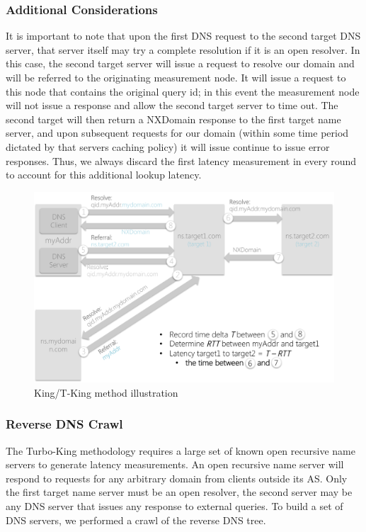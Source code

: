 \subsubsection{Additional Considerations}
It is important to note that upon the first DNS request to the second target DNS server, that server itself may try a complete resolution if it is an open resolver. In this case, the second target server will issue a request to resolve our domain and will be referred to the originating measurement node. It will issue a request to this node that contains the original query id; in this event the measurement node will not issue a response and allow the second target server to time out. The second target will then return a NXDomain response to the first target name server, and upon subsequent requests for our domain (within some time period dictated by that servers caching policy) it will issue continue to issue error responses. Thus, we always discard the first latency measurement in every round to account for this additional lookup latency.

\begin{figure}
  \centering
  \includegraphics[width=\linewidth]{../figs/king_model.pdf}
  \caption{King/T-King method illustration}
  \label{fig:king_model}
\end{figure}

\subsubsection{Reverse DNS Crawl}
The Turbo-King methodology requires a large set of known open recursive name servers to generate latency measurements. An open recursive name server will respond to requests for any arbitrary domain from clients outside its AS. Only the first target name server must be an open resolver, the second server may be any DNS server that issues any response to external queries. To build a set of DNS servers, we performed a crawl of the reverse DNS tree.

